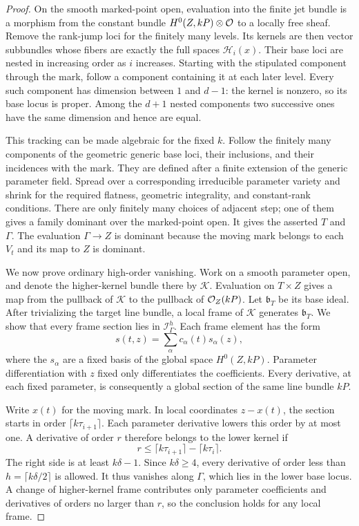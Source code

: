 \begin{proof}
On the smooth marked-point open, evaluation into the finite jet
bundle is a morphism from the constant bundle
$H^0(Z,kP)\otimes\mathcal{O}$ to a locally free sheaf. Remove the rank-jump
loci for the finitely many levels. Its kernels are then vector
subbundles whose fibers are exactly the full spaces
$\mathcal H_i(x)$. Their base loci are nested in increasing order
as $i$ increases. Starting with the stipulated component through
the mark, follow a component containing it at each later level.
Every such component has dimension between $1$ and $d-1$: the
kernel is nonzero, so its base locus is proper. Among the $d+1$
nested components two successive ones have the same dimension
and hence are equal.

This tracking can be made algebraic for the fixed $k$. Follow the
finitely many components of the geometric generic base loci,
their inclusions, and their incidences with the mark. They are
defined after a finite extension of the generic parameter field.
Spread over a corresponding irreducible parameter variety and
shrink for the required flatness, geometric integrality, and
constant-rank conditions. There are only finitely many choices
of adjacent step; one of them gives a family dominant over the
marked-point open. It gives the asserted $T$ and $\Gamma$.
The evaluation $\Gamma\to Z$ is dominant because the moving mark
belongs to each $V_t$ and its map to $Z$ is dominant.

We now prove ordinary high-order vanishing. Work on a smooth
parameter open, and denote the higher-kernel bundle there by
$\mathcal K$. Evaluation on $T\times Z$ gives a map from the
pullback of $\mathcal K$ to the pullback of $\mathcal{O}_Z(kP)$.
Let $\mathfrak b_T$ be its base ideal. After trivializing the
target line bundle, a local frame of $\mathcal K$ generates
$\mathfrak b_T$. We show that every frame section lies in
$\mathcal I_\Gamma^h$.
Each frame element has the form
\[
 s(t,z)=\sum_\alpha c_\alpha(t)s_\alpha(z),
\]
where the $s_\alpha$ are a fixed basis of the global space
$H^0(Z,kP)$. Parameter differentiation with $z$ fixed only
differentiates the coefficients. Every derivative, at each fixed
parameter, is consequently a global section of the same line
bundle $kP$.

Write $x(t)$ for the moving mark. In local coordinates $z-x(t)$,
the section starts in order $\lceil k\tau_{i+1}\rceil$. Each parameter
derivative lowers this order by at most one. A derivative of
order $r$ therefore belongs to the lower kernel if
\[
 r\leq\lceil k\tau_{i+1}\rceil-\lceil k\tau_i\rceil.
\]
The right side is at least $k\delta-1$. Since $k\delta\geq4$,
every derivative of order less than $h=\lceil k\delta/2\rceil$ is
allowed. It thus vanishes along $\Gamma$, which lies in the
lower base locus. A change of higher-kernel frame contributes
only parameter coefficients and derivatives of orders no larger
than $r$, so the conclusion holds for any local frame.


\end{proof}
